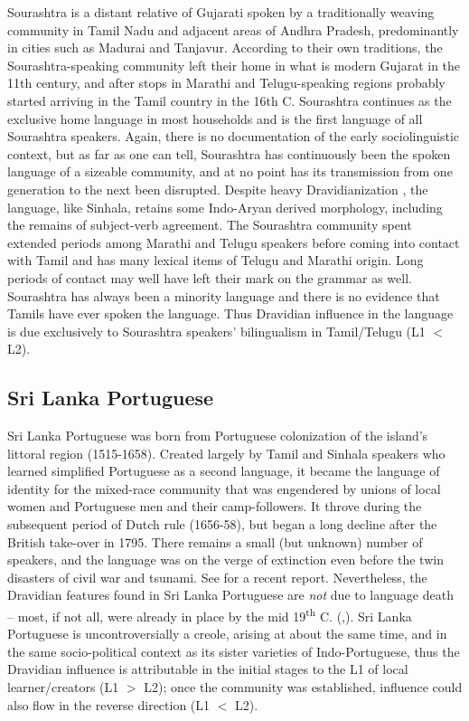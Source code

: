 Sourashtra is a distant relative of Gujarati spoken by a traditionally weaving community in Tamil Nadu and adjacent areas of Andhra Pradesh, predominantly in cities such as Madurai and Tanjavur. According to their own traditions, the Sourashtra-speaking community left their home in what is modern Gujarat in the 11th century, and after stops in Marathi and Telugu-speaking regions probably started arriving in the Tamil country in the 16th C. Sourashtra continues as the exclusive home language in most households and is the first language of all Sourashtra speakers. Again, there is no documentation of the early sociolinguistic context, but as far as one can tell, Sourashtra has continuously been the spoken language of a sizeable community, and at no point has its transmission from one generation to the next been disrupted. Despite heavy Dravidianization \citep[e.g.][]{Pandit1972}, the language, like Sinhala, retains some Indo-Aryan derived morphology, including the remains of subject-verb agreement. The Sourashtra community spent extended periods among Marathi and Telugu speakers before coming into contact with Tamil and has many lexical items of Telugu and Marathi origin. Long periods of contact may well have left their mark on the grammar as well. Sourashtra has always been a minority language and there is no evidence that Tamils have ever spoken the language. Thus Dravidian influence in the language is due exclusively to Sourashtra speakers' bilingualism in Tamil/Telugu (L1 $<$ L2).

\subsection{Sri Lanka Portuguese}

Sri Lanka Portuguese was born from Portuguese colonization of the island's littoral region (1515-1658). Created largely by Tamil and Sinhala speakers who learned simplified Portuguese as a second language, it became the language of identity for the mixed-race community that was engendered by unions of local women and Portuguese men and their camp-followers. It throve during the subsequent period of Dutch rule (1656-58), but began a long decline after the British take-over in 1795. There remains a small (but unknown) number of speakers, and the language was on the verge of extinction even before the twin disasters of civil war and tsunami. See \citet{Nordhofffcslp} for a recent report. Nevertheless, the Dravidian features found in Sri Lanka Portuguese are \textit{not} due to language death -- most, if not all, were already in place by the mid 19\textsuperscript{th} C. (\citet[231-214]{Smith1979convergence},\citet{Smith2005missionnaires}). Sri Lanka Portuguese is uncontroversially a creole, arising at about the same time, and in the same socio-political context as its sister varieties of Indo-Portuguese, thus the Dravidian influence is attributable in the initial stages to the L1 of local learner/creators (L1 $>$ L2); once the community was established, influence could also flow in the reverse direction (L1 $<$ L2). 

